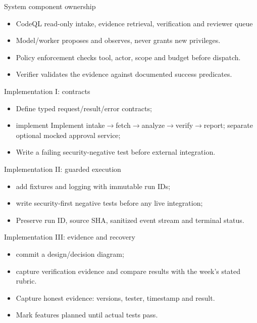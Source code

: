 \documentclass[aspectratio=169,10pt]{beamer}
\begin{document}
\begin{frame}{System component ownership}
\small
\begin{itemize}
\item CodeQL read-only intake, evidence retrieval, verification and reviewer queue
\item Model/worker proposes and observes, never grants new privileges.
\item Policy enforcement checks tool, actor, scope and budget before dispatch.
\item Verifier validates the evidence against documented success predicates.
\end{itemize}

\end{frame}

\begin{frame}{Implementation I: contracts}
\small
\begin{itemize}
\item Define typed request/result/error contracts;
\item implement Implement intake$\rightarrow$fetch$\rightarrow$analyze$\rightarrow$verify$\rightarrow$report; separate optional mocked approval service;
\item Write a failing security-negative test before external integration.
\end{itemize}

\end{frame}

\begin{frame}{Implementation II: guarded execution}
\small
\begin{itemize}
\item add fixtures and logging with immutable run IDs;
\item write security-first negative tests before any live integration;
\item Preserve run ID, source SHA, sanitized event stream and terminal status.
\end{itemize}

\end{frame}

\begin{frame}{Implementation III: evidence and recovery}
\small
\begin{itemize}
\item commit a design/decision diagram;
\item capture verification evidence and compare results with the week's stated rubric.
\item Capture honest evidence: versions, tester, timestamp and result.
\item Mark features planned until actual tests pass.
\end{itemize}

\end{frame}
\end{document}
